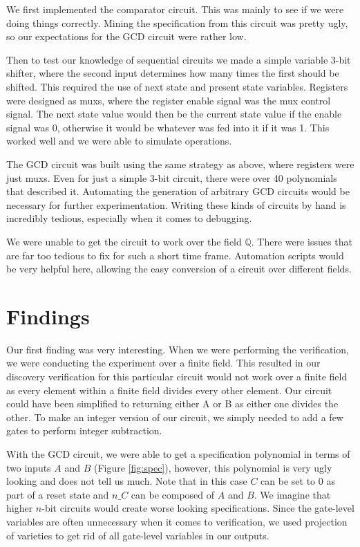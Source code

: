 \documentclass[12pt]{report}
\begin{document}
We first implemented the comparator circuit. This was mainly to see if we were doing things correctly. Mining the specification from this circuit was pretty ugly, so our expectations for the GCD circuit were rather low.

Then to test our knowledge of sequential circuits we made a simple variable 3-bit shifter, where the second input determines how many times the first should be shifted. This required the use of next state and present state variables. Registers were designed as muxs, where the register enable signal was the mux control signal. The next state value would then be the current state value if the enable signal was 0, otherwise it would be whatever was fed into it if it was 1. This worked well and we were able to simulate operations. 

The GCD circuit was built using the same strategy as above, where registers were just muxs. Even for just a simple 3-bit circuit, there were over 40 polynomials that described it. Automating the generation of arbitrary GCD circuits would be necessary for further experimentation. Writing these kinds of circuits by hand is incredibly tedious, especially when it comes to debugging. 

We were unable to get the circuit to work over the field $\mathbb{Q}$. There were issues that are far too tedious to fix for such a short time frame. Automation scripts would be very helpful here, allowing the easy conversion of a circuit over different fields.

\section{Findings}

Our first finding was very interesting. When we were performing the verification, we were conducting the experiment over a finite field. This resulted in our discovery verification for this particular circuit would not work over a finite field as every element within a finite field divides every other element. Our circuit could have been simplified to returning either A or B as either one divides the other. To make an integer version of our circuit, we simply needed to add a few gates to perform integer subtraction. 

With the GCD circuit, we were able to get a specification polynomial in terms of two inputs $A$ and $B$ (Figure \ref{fig:spec}), however, this polynomial is very ugly looking and does not tell us much. Note that in this case $C$ can be set to 0 as part of a reset state and $n\_C$ can be composed of $A$ and $B$. We imagine that higher $n$-bit circuits would create worse looking specifications. Since the gate-level variables are often unnecessary when it comes to verification, we used projection of varieties to get rid of all gate-level variables in our outputs.
\end{document}
